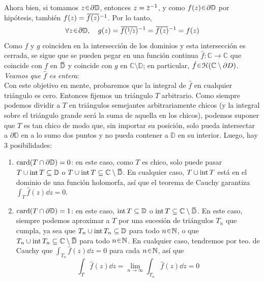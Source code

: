 \begin{sol}
Ahora bien, si tomamos $z\en\partial \mathbb{D}$, entonces $z = \ubar{z}^{-1}$, y como $f(z) \en \partial \mathbb{D}$ por hipótesis, también $f(z) = \ubar{f(z)}^{-1}$. Por lo tanto, 
\[
\forall z \en \partial \mathbb{D},\quad
g(z) = \ubar{f(\nicefrac{1}{\ubar{z}})}^{-1} = \ubar{f(z)}^{-1} = f(z)
\]
Como $f$ y $g$ coinciden en la intersección de los dominios y esta intersección es cerrada, se sigue que se pueden pegar en una función continua $\hat{f} \colon \mathbb{C} \to \mathbb{C}$ que coincide con $f$ en $\ubar{\mathbb{D}}$ y coincide con $g$ en $\mathbb{C}\setminus \mathbb{D}$; en particular, $\hat{f} \en \mathcal{H}(\mathbb{C}\setminus\partial D)$.\vspace{1em}\\
\emph{Veamos que $\hat{f}$ es entera}:\\
Con este objetivo en mente, probaremos que la integral de $\hat{f}$ en cualquier triángulo es cero. Entonces fijemos un triángulo $T$ arbitrario. Como siempre podemos dividir a $T$ en triángulos semejantes arbitrariamente chicos (y la integral sobre el triángulo grande será la suma de aquella en los chicos), podemos suponer que $T$ es tan chico de modo que, sin importar su posición, solo pueda intersectar a $\partial\mathbb{D}$ en a lo sumo dos puntos y no pueda contener a $\mathbb{D}$ en su interior. Luego, hay 3 posibilidades:
\begin{enumerate}[label=(\roman*), leftmargin=1.6em]
\item $\operatorname{card}(T \cap \partial\mathbb{D}) = 0$: en este caso, como $T$ es chico, solo puede pasar $T\cup\operatorname{int}  T \subseteq \mathbb{D}$ o $T\cup\inter  T \subseteq \mathbb{C}\setminus\ubar{\mathbb{D}}$. En cualquier caso, $T \cup \operatorname{int}  T$ está en el dominio de una función holomorfa, así que el teorema de Cauchy garantiza $\int_T \hat{f}(z)\dd{z} = 0$.

\item $\operatorname{card}(T \cap \partial\mathbb{D}) = 1$: en este caso, $\operatorname{int} T \subseteq \mathbb{D}$ o $\inter T \subseteq \mathbb{C} \setminus \ubar{\mathbb{D}}$. En este caso, siempre podemos aproximar a $T$ por una sucesión de triángulos $T_n$ que cumpla, ya sea que $T_n \cup \operatorname{int} T_n \subseteq \mathbb{D}$ para todo $n\en\mathbb{N}$, o que $T_n \cup \inter T_n \subseteq \mathbb{C} \setminus \ubar{\mathbb{D}}$ para todo $n\en\mathbb{N}$. En cualquier caso, tendremos por teo. de Cauchy que $\int_{T_n} \hat{f}(z) \dd{z} = 0$ para cada $n\en\mathbb{N}$, así que 
\[
\int_T \hat{f}(z) \dd{z} = \lim_{n\to\infty} \int_{T_n} \hat{f}(z) \dd{z} = 0
\]


\end{enumerate}
\end{sol}

